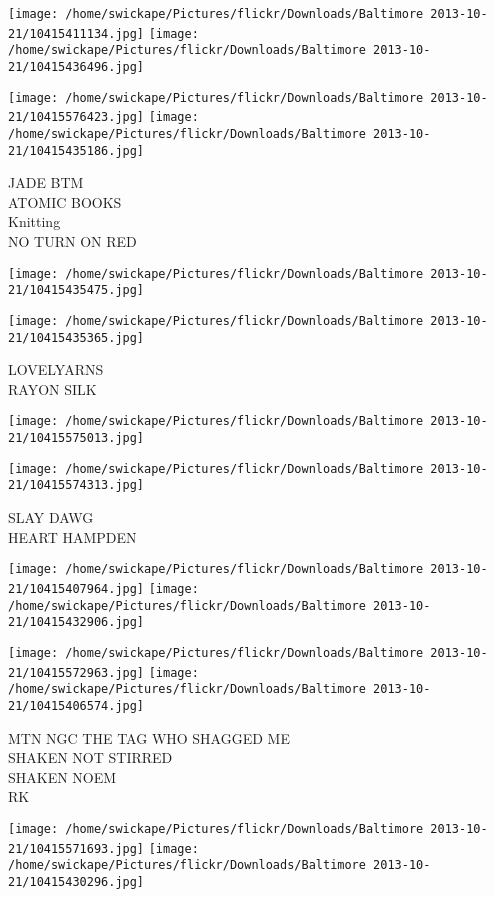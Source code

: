 \documentclass[10pt,letterpaper]{article}
\begin{document}
\texttt{[image: /home/swickape/Pictures/flickr/Downloads/Baltimore 2013-10-21/10415411134.jpg]}
\texttt{[image: /home/swickape/Pictures/flickr/Downloads/Baltimore 2013-10-21/10415436496.jpg]}

\texttt{[image: /home/swickape/Pictures/flickr/Downloads/Baltimore 2013-10-21/10415576423.jpg]}
\texttt{[image: /home/swickape/Pictures/flickr/Downloads/Baltimore 2013-10-21/10415435186.jpg]}

JADE BTM\\
ATOMIC BOOKS\\
Knitting\\
NO TURN ON RED
\pagebreak

\texttt{[image: /home/swickape/Pictures/flickr/Downloads/Baltimore 2013-10-21/10415435475.jpg]}

\vspace{0.25in}
\texttt{[image: /home/swickape/Pictures/flickr/Downloads/Baltimore 2013-10-21/10415435365.jpg]}

LOVELYARNS\\
RAYON SILK
\pagebreak

\texttt{[image: /home/swickape/Pictures/flickr/Downloads/Baltimore 2013-10-21/10415575013.jpg]}

\vspace{0.25in}
\texttt{[image: /home/swickape/Pictures/flickr/Downloads/Baltimore 2013-10-21/10415574313.jpg]}

SLAY DAWG\\
HEART HAMPDEN
\pagebreak

\texttt{[image: /home/swickape/Pictures/flickr/Downloads/Baltimore 2013-10-21/10415407964.jpg]}
\texttt{[image: /home/swickape/Pictures/flickr/Downloads/Baltimore 2013-10-21/10415432906.jpg]}

\texttt{[image: /home/swickape/Pictures/flickr/Downloads/Baltimore 2013-10-21/10415572963.jpg]}
\texttt{[image: /home/swickape/Pictures/flickr/Downloads/Baltimore 2013-10-21/10415406574.jpg]}

MTN NGC THE TAG WHO SHAGGED ME\\
SHAKEN NOT STIRRED\\
SHAKEN NOEM\\
RK
\pagebreak

\texttt{[image: /home/swickape/Pictures/flickr/Downloads/Baltimore 2013-10-21/10415571693.jpg]}
\texttt{[image: /home/swickape/Pictures/flickr/Downloads/Baltimore 2013-10-21/10415430296.jpg]}
\end{document}
